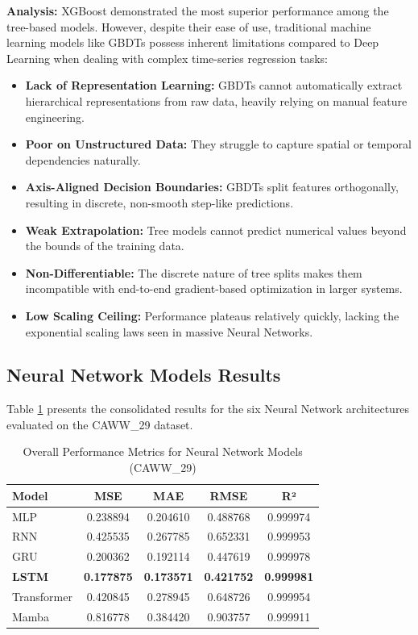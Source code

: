 \documentclass[a4paper]{article}
\begin{document}
\textbf{Analysis:} XGBoost demonstrated the most superior performance among the tree-based models. However, despite their ease of use, traditional machine learning models like GBDTs possess inherent limitations compared to Deep Learning when dealing with complex time-series regression tasks:
\begin{itemize}
    \item \textbf{Lack of Representation Learning:} GBDTs cannot automatically extract hierarchical representations from raw data, heavily relying on manual feature engineering.
    \item \textbf{Poor on Unstructured Data:} They struggle to capture spatial or temporal dependencies naturally.
    \item \textbf{Axis-Aligned Decision Boundaries:} GBDTs split features orthogonally, resulting in discrete, non-smooth step-like predictions.
    \item \textbf{Weak Extrapolation:} Tree models cannot predict numerical values beyond the bounds of the training data.
    \item \textbf{Non-Differentiable:} The discrete nature of tree splits makes them incompatible with end-to-end gradient-based optimization in larger systems.
    \item \textbf{Low Scaling Ceiling:} Performance plateaus relatively quickly, lacking the exponential scaling laws seen in massive Neural Networks.
\end{itemize}

\subsection{Neural Network Models Results}

Table \ref{tab:nn_metrics} presents the consolidated results for the six Neural Network architectures evaluated on the CAWW\_29 dataset.

\begin{table}[h!]
\centering
\caption{Overall Performance Metrics for Neural Network Models (CAWW\_29)}
\label{tab:nn_metrics}
\begin{tabular}{lcccc}
\toprule
\textbf{Model} & \textbf{MSE} & \textbf{MAE} & \textbf{RMSE} & \textbf{R²} \\
\midrule
MLP & 0.238894 & 0.204610 & 0.488768 & 0.999974 \\
RNN & 0.425535 & 0.267785 & 0.652331 & 0.999953 \\
GRU & 0.200362 & 0.192114 & 0.447619 & 0.999978 \\
\textbf{LSTM} & \textbf{0.177875} & \textbf{0.173571} & \textbf{0.421752} & \textbf{0.999981} \\
Transformer & 0.420845 & 0.278945 & 0.648726 & 0.999954 \\
Mamba & 0.816778 & 0.384420 & 0.903757 & 0.999911 \\
\bottomrule
\end{tabular}
\end{table}
\end{document}
